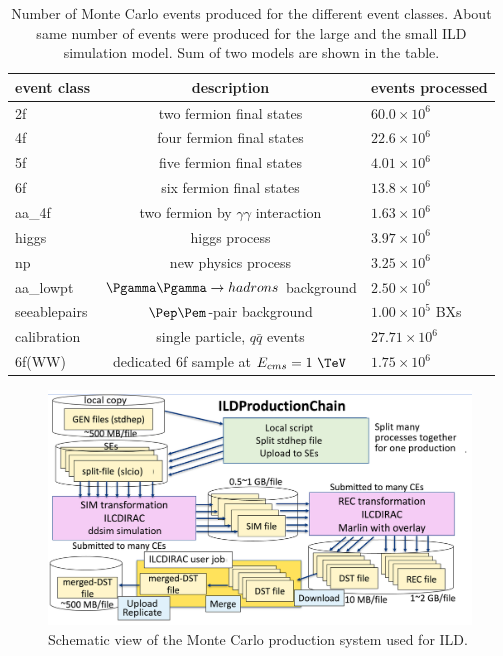 \begin{table}[htbp]
\renewcommand{\arraystretch}{1.25}

\centering\small
\begin{tabular}{lcl}
\hline
 event class  &  description & events processed \\ 
\hline 
2f &   two fermion  final states &  $60.0 \times 10^6$ \\
4f &  four fermion final states & $22.6 \times 10^6$ \\
5f &  five fermion final states & $4.01 \times 10^6$ \\
6f &   six fermion  final states &  $13.8 \times 10^6$ \\
aa\_4f & two fermion by $\gamma\gamma$ interaction & $1.63 \times 10^6$ \\
higgs & higgs process & $3.97 \times 10^6$ \\
np & new physics process & $3.25 \times 10^6$ \\
\hline
aa\_lowpt &  $\Pgamma \Pgamma \to hadrons$ background  &  $2.50 \times 10^6$ \\
seeablepairs &   $\Pep\Pem$-pair background    &  $1.00\times 10^5$ BXs \\
calibration & single particle, $q\bar{q}$ events & $27.71\times 10^6$ \\
\hline
6f(WW) &  dedicated 6f sample at $E_{cms}=1~\TeV$ &  $1.75 \times 10^6$ \\

\hline
\end{tabular}
\caption{\label{tab:mcprod_evtnum} Number of Monte Carlo events produced for the different event classes. 
About same number of events were produced for the large and the small ILD simulation model.
Sum of two models are shown in the table.} 
\end{table}



\begin{figure}[b!]
\includegraphics[width=1.0\hsize]{Modelling/fig/ilcdirac_ild_scheme.png}
\caption{\label{fig:sim_ild_mcprod} Schematic view of the Monte Carlo production system used for ILD.}
\end{figure}


